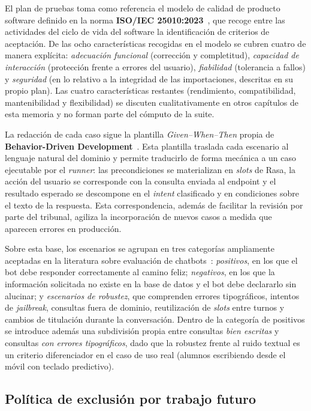 El plan de pruebas toma como referencia el modelo de calidad de producto software definido en la norma \textbf{ISO/IEC 25010:2023}~\cite{iso25010}, que recoge entre las actividades del ciclo de vida del software la identificación de criterios de aceptación. De las ocho características recogidas en el modelo se cubren cuatro de manera explícita: \textit{adecuación funcional} (corrección y completitud), \textit{capacidad de interacción} (protección frente a errores del usuario), \textit{fiabilidad} (tolerancia a fallos) y \textit{seguridad} (en lo relativo a la integridad de las importaciones, descritas en su propio plan). Las cuatro características restantes (rendimiento, compatibilidad, mantenibilidad y flexibilidad) se discuten cualitativamente en otros capítulos de esta memoria y no forman parte del cómputo de la suite.

La redacción de cada caso sigue la plantilla \textit{Given--When--Then} propia de \textbf{Behavior-Driven Development}~\cite{north2006bdd}. Esta plantilla traslada cada escenario al lenguaje natural del dominio y permite traducirlo de forma mecánica a un caso ejecutable por el \textit{runner}: las precondiciones se materializan en \textit{slots} de Rasa, la acción del usuario se corresponde con la consulta enviada al endpoint y el resultado esperado se descompone en el \textit{intent} clasificado y en condiciones sobre el texto de la respuesta. Esta correspondencia, además de facilitar la revisión por parte del tribunal, agiliza la incorporación de nuevos casos a medida que aparecen errores en producción.

Sobre esta base, los escenarios se agrupan en tres categorías ampliamente aceptadas en la literatura sobre evaluación de chatbots~\cite{xoriantChatbot,testio}: \textit{positivos}, en los que el bot debe responder correctamente al camino feliz; \textit{negativos}, en los que la información solicitada no existe en la base de datos y el bot debe declararlo sin alucinar; y \textit{escenarios de robustez}, que comprenden errores tipográficos, intentos de \textit{jailbreak}, consultas fuera de dominio, reutilización de \textit{slots} entre turnos y cambios de titulación durante la conversación. Dentro de la categoría de positivos se introduce además una subdivisión propia entre consultas \textit{bien escritas} y consultas \textit{con errores tipográficos}, dado que la robustez frente al ruido textual es un criterio diferenciador en el caso de uso real (alumnos escribiendo desde el móvil con teclado predictivo).

\subsection{Política de exclusión por trabajo futuro}\label{subsec:pruebas-trabajo-futuro}

